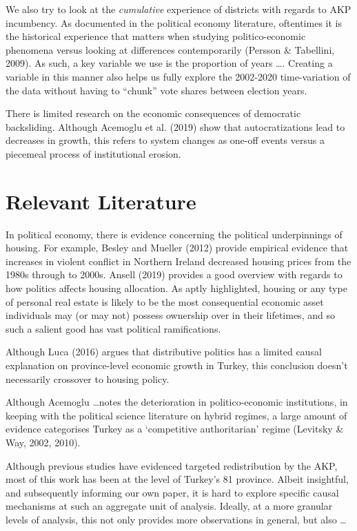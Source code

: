 \documentclass[10pt, oneside]{article}   	%
\numberwithin{equation}{section}
\begin{document}
We also try to look at the \textit{cumulative} experience of districts with regards to AKP incumbency. As documented in the political economy literature, oftentimes it is the historical experience that matters when studying politico-economic phenomena versus looking at differences contemporarily (Persson \& Tabellini, 2009). As such, a key variable we use is the proportion of years \dots . Creating a variable in this manner also helps us fully explore the 2002-2020 time-variation of the data without having to ``chunk'' vote shares between election years. 

There is limited research on the economic consequences of democratic backsliding. Although Acemoglu et al. (2019) show that autocratizations lead to decreases in growth, this refers to system changes as one-off events versus a piecemeal process of institutional erosion. 

\section{Relevant Literature}

In political economy, there is evidence concerning the political underpinnings of housing. For example, Besley and Mueller (2012) provide empirical evidence that increases in violent conflict in Northern Ireland decreased housing prices from the 1980s through to 2000s. Ansell (2019) provides a good overview with regards to how politics affects housing allocation. As aptly highlighted, housing or any type of personal real estate is likely to be the most consequential economic asset individuals may (or may not) possess ownership over in their lifetimes, and so such a salient good has vast political ramifications. 

Although Luca (2016) argues that distributive politics has a limited causal explanation on province-level economic growth in Turkey, this conclusion doesn't necessarily crossover to housing policy. 

Although Acemoglu \dots notes the deterioration in politico-economic institutions, in keeping with the political science literature on hybrid regimes, a large amount of evidence categorises Turkey as a `competitive authoritarian' regime (Levitsky \& Way, 2002, 2010). 

Although previous studies have evidenced targeted redistribution by the AKP, most of this work has been at the level of Turkey's 81 province. Albeit insightful, and subsequently informing our own paper, it is hard to explore specific causal mechanisms at such an aggregate unit of analysis. Ideally, at a more granular levels of analysis, this not only provides more observations in general, but also \dots 
\end{document}
